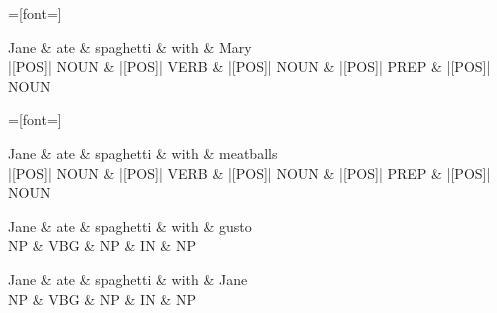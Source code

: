 \documentclass{article}
\begin{document}
    \begin{dependency}[theme=simple]
        =[font=\scriptsize]%
        \begin{deptext}
			Jane \& ate \& spaghetti \& with \& Mary \\
            |[POS]| NOUN \& |[POS]| VERB \& |[POS]| NOUN \& |[POS]| PREP \& |[POS]| NOUN \\
        \end{deptext}
    \end{dependency}

    \begin{dependency}[theme=simple]
        =[font=\scriptsize]%
        \begin{deptext}
			Jane \& ate \& spaghetti \& with \& meatballs \\
            |[POS]| NOUN \& |[POS]| VERB \& |[POS]| NOUN \& |[POS]| PREP \& |[POS]| NOUN \\
        \end{deptext}
    \end{dependency}

    \begin{dependency}
        \begin{deptext}
			Jane \& ate \& spaghetti \& with \& gusto \\
            NP \& VBG \& NP \& IN \& NP \\
        \end{deptext}
    \end{dependency}
    
    \begin{dependency}
        \begin{deptext}
			Jane \& ate \& spaghetti \& with \& Jane \\
            NP \& VBG \& NP \& IN \& NP \\
        \end{deptext}
    \end{dependency}
    
\end{document}
